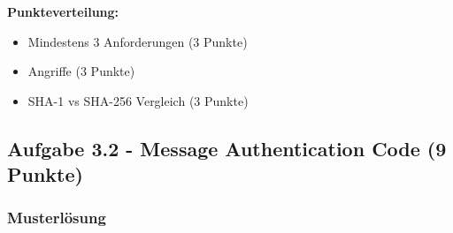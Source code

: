 \documentclass[12pt,a4paper]{article}
\begin{document}
\textbf{Punkteverteilung:}
\begin{itemize}
    \item Mindestens 3 Anforderungen (3 Punkte) \checkmark
    \item Angriffe (3 Punkte) \checkmark
    \item SHA-1 vs SHA-256 Vergleich (3 Punkte) \checkmark
\end{itemize}

\subsection{Aufgabe 3.2 - Message Authentication Code (9 Punkte)}

\subsubsection*{Musterlösung}
\end{document}
